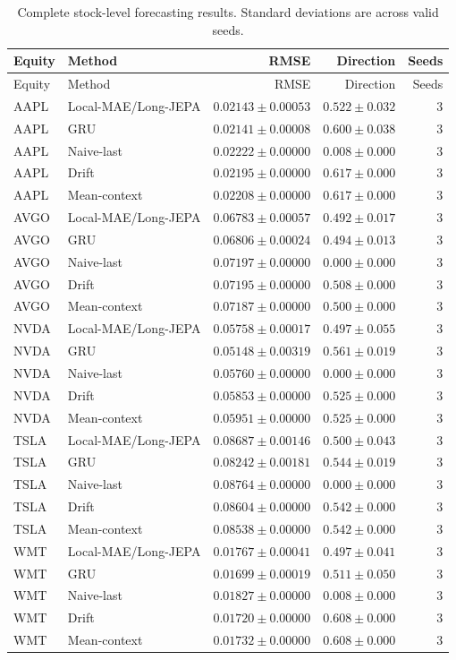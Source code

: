 \begin{longtable}{llrrr}
\caption{Complete stock-level forecasting results. Standard deviations are across valid seeds.}\label{tab:appendix_stock_metrics}\\
\toprule
Equity & Method & RMSE & Direction & Seeds \\
\midrule
\endfirsthead
\toprule
Equity & Method & RMSE & Direction & Seeds \\
\midrule
\endhead
AAPL & Local-MAE/Long-JEPA & $0.02143 \pm 0.00053$ & $0.522 \pm 0.032$ & 3 \\
AAPL & GRU & $0.02141 \pm 0.00008$ & $0.600 \pm 0.038$ & 3 \\
AAPL & Naive-last & $0.02222 \pm 0.00000$ & $0.008 \pm 0.000$ & 3 \\
AAPL & Drift & $0.02195 \pm 0.00000$ & $0.617 \pm 0.000$ & 3 \\
AAPL & Mean-context & $0.02208 \pm 0.00000$ & $0.617 \pm 0.000$ & 3 \\
AVGO & Local-MAE/Long-JEPA & $0.06783 \pm 0.00057$ & $0.492 \pm 0.017$ & 3 \\
AVGO & GRU & $0.06806 \pm 0.00024$ & $0.494 \pm 0.013$ & 3 \\
AVGO & Naive-last & $0.07197 \pm 0.00000$ & $0.000 \pm 0.000$ & 3 \\
AVGO & Drift & $0.07195 \pm 0.00000$ & $0.508 \pm 0.000$ & 3 \\
AVGO & Mean-context & $0.07187 \pm 0.00000$ & $0.500 \pm 0.000$ & 3 \\
NVDA & Local-MAE/Long-JEPA & $0.05758 \pm 0.00017$ & $0.497 \pm 0.055$ & 3 \\
NVDA & GRU & $0.05148 \pm 0.00319$ & $0.561 \pm 0.019$ & 3 \\
NVDA & Naive-last & $0.05760 \pm 0.00000$ & $0.000 \pm 0.000$ & 3 \\
NVDA & Drift & $0.05853 \pm 0.00000$ & $0.525 \pm 0.000$ & 3 \\
NVDA & Mean-context & $0.05951 \pm 0.00000$ & $0.525 \pm 0.000$ & 3 \\
TSLA & Local-MAE/Long-JEPA & $0.08687 \pm 0.00146$ & $0.500 \pm 0.043$ & 3 \\
TSLA & GRU & $0.08242 \pm 0.00181$ & $0.544 \pm 0.019$ & 3 \\
TSLA & Naive-last & $0.08764 \pm 0.00000$ & $0.000 \pm 0.000$ & 3 \\
TSLA & Drift & $0.08604 \pm 0.00000$ & $0.542 \pm 0.000$ & 3 \\
TSLA & Mean-context & $0.08538 \pm 0.00000$ & $0.542 \pm 0.000$ & 3 \\
WMT & Local-MAE/Long-JEPA & $0.01767 \pm 0.00041$ & $0.497 \pm 0.041$ & 3 \\
WMT & GRU & $0.01699 \pm 0.00019$ & $0.511 \pm 0.050$ & 3 \\
WMT & Naive-last & $0.01827 \pm 0.00000$ & $0.008 \pm 0.000$ & 3 \\
WMT & Drift & $0.01720 \pm 0.00000$ & $0.608 \pm 0.000$ & 3 \\
WMT & Mean-context & $0.01732 \pm 0.00000$ & $0.608 \pm 0.000$ & 3 \\
\bottomrule
\end{longtable}
